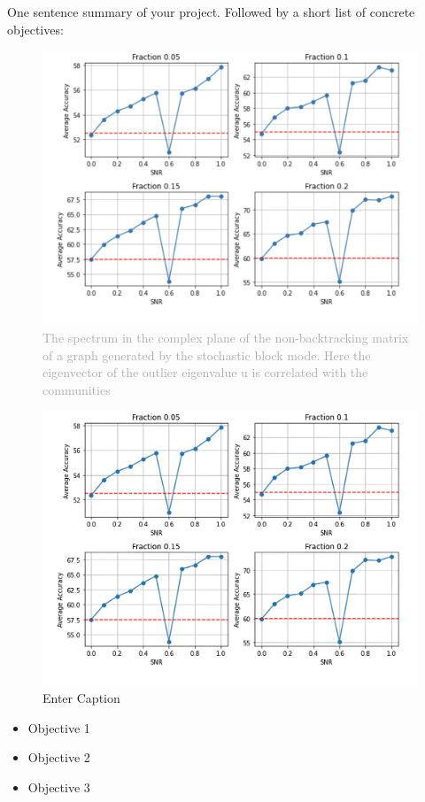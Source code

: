 One sentence summary of your project. Followed by a short list of concrete objectives:
\begin{figure}
    \centering
    \includegraphics[width=1\linewidth]{Figures/Screenshot 2024-03-14 at 02.18.52.png}
    \caption{\textcolor{darkgray}{\small The spectrum in the complex plane of the non-backtracking matrix of a graph generated by the stochastic block mode. Here the eigenvector of the outlier eigenvalue u is correlated with the communities}}
    \label{fig:enter-label}
\end{figure}
\begin{figure}
    \centering
    \includegraphics[width=1\linewidth]{Figures/Screenshot 2024-03-14 at 02.18.52.1.png}
    \caption{Enter Caption}
    \label{fig:enter-label}
\end{figure}
\begin{itemize}
    \item Objective 1
    \item Objective 2
    \item Objective 3
\end{itemize}